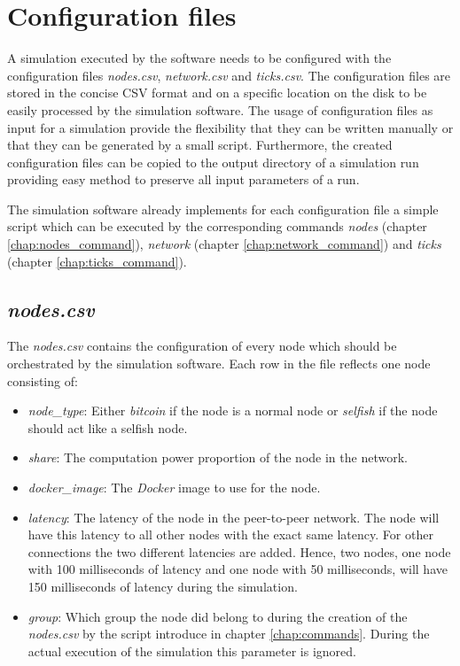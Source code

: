 \section{Configuration files}
\label{chap:config_files}

A simulation executed by the software needs to be configured with the configuration files \textit{nodes.csv}, \textit{network.csv} and \textit{ticks.csv}.
The configuration files are stored in the concise CSV format and on a specific location on the disk to be easily processed by the simulation software.
The usage of configuration files as input for a simulation provide the flexibility that they can be written manually or that they can be generated by a small script.
Furthermore, the created configuration files can be copied to the output directory of a simulation run providing easy method to preserve all input parameters of a run.

The simulation software already implements for each configuration file a simple script which can be executed by the corresponding commands \textit{nodes} (chapter \ref{chap:nodes_command}), \textit{network} (chapter \ref{chap:network_command}) and \textit{ticks} (chapter \ref{chap:ticks_command}).

\subsection{\textit{nodes.csv}}

The \textit{nodes.csv} contains the configuration of every node which should be orchestrated by the simulation software.
Each row in the file reflects one node consisting of:
\begin{itemize}
	\item \textit{node\_type}: Either \textit{bitcoin} if the node is a normal node or \textit{selfish} if the node should act like a selfish node.
	\item \textit{share}: The computation power proportion of the node in the network.
	\item \textit{docker\_image}: The \textit{Docker} image to use for the node.
	\item \textit{latency}: The latency  of the node in the peer-to-peer network.
	The node will have this latency to all other nodes with the exact same latency.
	For other connections the two different latencies are added.
	Hence, two nodes, one node with 100 milliseconds of latency and one node with 50 milliseconds, will have 150 milliseconds of latency during the simulation.
	\item \textit{group}: Which group the node did belong to during the creation of the \textit{nodes.csv} by the script introduce in chapter \ref{chap:commands}.
	During the actual execution of the simulation this parameter is ignored.
\end{itemize}
 
